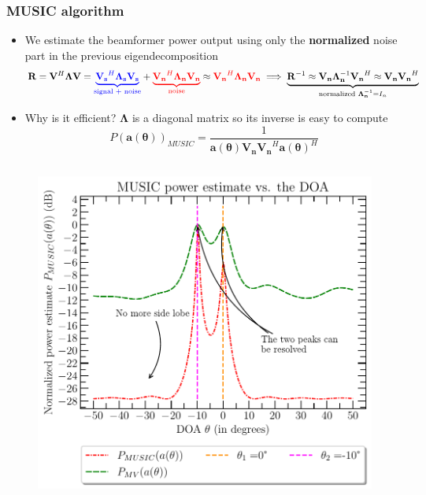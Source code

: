 \documentclass[UKenglish,8pt,aspectratio=1610]{beamer}
\begin{document}
\begin{frame}
	\frametitle{MUSIC algorithm \cite{twoDecades,uncini,Johnson1993ArraySP}}
	\begin{itemize}
		\item We estimate the beamformer power output using only the \textbf{normalized} noise part in the previous eigendecomposition
		\begin{equation}
			\mathbf{R}=\mathbf{V}^H\boldsymbol{\Lambda}\mathbf{V} = \textcolor{blue}{\underbrace{\mathbf{V_s}^H\boldsymbol{\Lambda}_{\mathbf{s}}\mathbf{V_s}}_{\text{signal + noise}} }+ \textcolor{red}{\underbrace{\mathbf{V_n}^H\boldsymbol{\Lambda}_{\mathbf{n}}\mathbf{V_n}}_{\text{noise}}}\approx \textcolor{red}{\mathbf{V_n}^H\boldsymbol{\Lambda}_{\mathbf{n}}\mathbf{V_n}}\implies \underbrace{\mathbf{R}^{-1}\approx \mathbf{V_n}\boldsymbol{\Lambda}_{\mathbf{n}}^{-1}\mathbf{V_n}^H\approx\mathbf{V_n}\mathbf{V_n}^H}_{\text{normalized }\boldsymbol{\Lambda}_{\mathbf{n}}^{-1}=I_n}
		\end{equation}
	\item Why is it efficient? $\boldsymbol{\Lambda}$ is a diagonal matrix so its inverse is easy to compute
	\begin{equation}
		P(\mathbf{a(\theta)})_{MUSIC}=\dfrac{1}{\mathbf{a(\theta)}\mathbf{V_n}\mathbf{V_n}^H\mathbf{a(\theta)}^H}
	\end{equation}
	\end{itemize}
\begin{columns}
	\begin{column}{0.5\textwidth}
		\begin{figure}[h!]
			\vspace{-15pt}
			\centering
			\includegraphics[scale=0.4]{question5/part_A_question_5_music_spectrum_estimate.pdf}

\end{figure}
\end{column}
\end{columns}
\end{frame}
\end{document}
